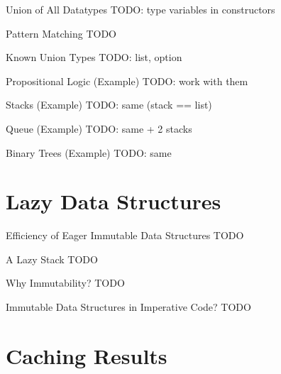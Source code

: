 \documentclass{beamer}
\begin{document}
\begin{frame}{Union of All Datatypes}
  TODO: type variables in constructors
\end{frame}

\begin{frame}{Pattern Matching}
  TODO
\end{frame}

\begin{frame}{Known Union Types}
  TODO: list, option
\end{frame}

\begin{frame}{Propositional Logic (Example)}
  TODO: work with them
\end{frame}

\begin{frame}{Stacks (Example)}
  TODO: same (stack == list)
\end{frame}

\begin{frame}{Queue (Example)}
  TODO: same + 2 stacks
\end{frame}

\begin{frame}{Binary Trees (Example)}
  TODO: same
\end{frame}

\section{Lazy Data Structures}
\frame{\tableofcontents[currentsection]}

\begin{frame}{Efficiency of Eager Immutable Data Structures}
  TODO
\end{frame}

\begin{frame}{A Lazy Stack}
  TODO
\end{frame}

\begin{frame}{Why Immutability?}
  TODO
\end{frame}

\begin{frame}{Immutable Data Structures in Imperative Code?}
  TODO
\end{frame}

\section{Caching Results}
\frame{\tableofcontents[currentsection]}
\end{document}
